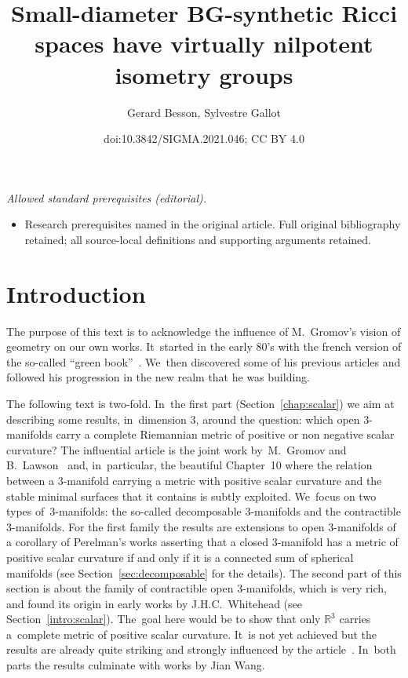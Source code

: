 \documentclass[10pt,a4paper]{amsart}
\title{Small-diameter BG-synthetic Ricci spaces have virtually nilpotent isometry groups}
\author{Gerard Besson, Sylvestre Gallot}
\date{doi:10.3842/SIGMA.2021.046; CC BY 4.0}
\numberwithin{equation}{section}
\begin{document}
\maketitle
\noindent\textit{Allowed standard prerequisites (editorial).}\begin{itemize}
\item Research prerequisites named in the original article. Full original bibliography retained; all source-local definitions and supporting arguments retained.
\end{itemize}\medskip
\section{Introduction}

The purpose of this text is to acknowledge the influence of M.~Gromov's vision of geometry on our own works. It~started in the early 80's with the french version of the so-called ``green book''~\cite{Gr1}. We~then discovered some of his previous articles and followed his progression in the new realm that he was building.

The following text is two-fold. In~the first part (Section~\ref{chap:scalar}) we aim at describing some results, in~dimension $3$, around the question: which open $3$-manifolds carry a complete Riemannian metric of positive or non negative scalar curvature? The influential article is the joint work by~M.~Gromov and B.~Lawson~\cite{GromovLawson} and, in~particular, the beautiful Chapter~10 where the relation between a $3$-manifold carrying a metric with positive scalar curvature and the stable minimal surfaces that it contains is subtly exploited. We~focus on two types of~$3$-manifolds: the so-called decomposable $3$-manifolds and the contractible
$3$-manifolds. For the first family the results are extensions to open $3$-manifolds of a corollary of Perelman's works asserting that a closed $3$-manifold has a metric of positive scalar curvature if and only if it is
a connected sum of spherical manifolds (see Section~\ref{sec:decomposable} for the details). The second part of this section is about the family of contractible open $3$-manifolds, which is very rich, and found its origin
in early works by J.H.C.~Whitehead (see Section~\ref{intro:scalar}). The~goal here would be to show that only $\mathbb{R}^3$ carries a~complete metric of positive scalar curvature. It~is not yet achieved but the results are already quite striking and strongly influenced by the article~\cite{GromovLawson}. In~both parts the results culminate with works by Jian Wang.
\end{document}
